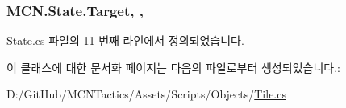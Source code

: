\subsubsection[{\texorpdfstring{Target}{Target}}]{ M\+C\+N.\+State.\+Target\hspace{0.3cm}{\ttfamily [get]}, {\ttfamily [protected]}, {\ttfamily [inherited]}}\hypertarget{class_m_c_n_1_1_state_a79a563b32f183c9adc9a96679fc57eb8}{}\label{class_m_c_n_1_1_state_a79a563b32f183c9adc9a96679fc57eb8}


State.\+cs 파일의 11 번째 라인에서 정의되었습니다.



이 클래스에 대한 문서화 페이지는 다음의 파일로부터 생성되었습니다.\+:\begin{DoxyCompactItemize}
\item 
D\+:/\+Git\+Hub/\+M\+C\+N\+Tactics/\+Assets/\+Scripts/\+Objects/\hyperlink{_tile_8cs}{Tile.\+cs}\end{DoxyCompactItemize}
